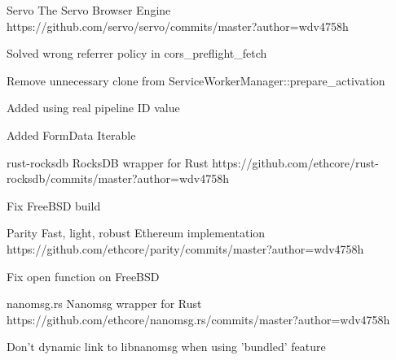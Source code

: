 
\begin{cvopensources}

  \cvopensource
    {Servo}   %
    {The Servo Browser Engine}  %
    {https://github.com/servo/servo/commits/master?author=wdv4758h}
    {
      \begin{cvitems}   %
        \item {Solved wrong referrer policy in cors\_preflight\_fetch}
        \item {Remove unnecessary clone from ServiceWorkerManager::prepare\_activation}
        \item {Added using real pipeline ID value}
        \item {Added FormData Iterable}
      \end{cvitems}
    }

  \cvopensource
    {rust-rocksdb}   %
    {RocksDB wrapper for Rust}  %
    {https://github.com/ethcore/rust-rocksdb/commits/master?author=wdv4758h}
    {
      \begin{cvitems}   %
        \item {Fix FreeBSD build}
      \end{cvitems}
    }

  \cvopensource
    {Parity}   %
    {Fast, light, robust Ethereum implementation}  %
    {https://github.com/ethcore/parity/commits/master?author=wdv4758h}
    {
      \begin{cvitems}   %
        \item {Fix open function on FreeBSD}
      \end{cvitems}
    }

  \cvopensource
    {nanomsg.rs}   %
    {Nanomsg wrapper for Rust}  %
    {https://github.com/ethcore/nanomsg.rs/commits/master?author=wdv4758h}
    {
      \begin{cvitems}   %
        \item {Don't dynamic link to libnanomsg when using 'bundled' feature}
      \end{cvitems}
    }


\end{cvopensources}
